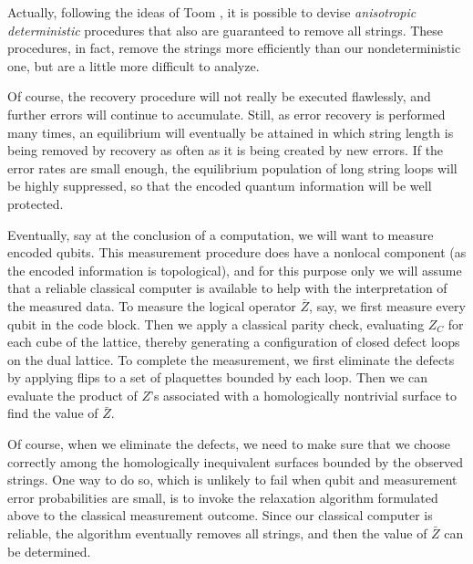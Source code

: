 Actually, following the ideas of Toom \cite{toom}, it is possible to devise {\em anisotropic deterministic} procedures that also are guaranteed to remove all strings. These procedures, in fact, remove the strings more efficiently than our nondeterministic one, but are a little more difficult to analyze.

Of course, the recovery procedure will not really be executed flawlessly, and further errors
will continue to accumulate. Still, as error recovery is performed many times,
an equilibrium will eventually be attained in which string length is being
removed by recovery as often as it is being created by new errors.  If the
error rates are small enough, the equilibrium population of long string loops
will be highly suppressed, so that the encoded quantum information will be well
protected.

Eventually, say at the conclusion of a computation, we will want to measure
encoded qubits.  This measurement procedure does have a nonlocal component (as
the encoded information is topological), and for this purpose only we will
assume that a reliable classical computer is available to help with the
interpretation of the measured data. To measure the logical operator $\bar Z$,
say, we first measure every qubit in the code block.  Then we apply a classical
parity check, evaluating $Z_C$ for each cube of the lattice, thereby generating a
configuration of closed defect loops on the dual lattice.  To complete the
measurement, we first eliminate the defects by applying flips to a set of
plaquettes bounded by each loop. Then we can evaluate the product of $Z$'s
associated with a homologically nontrivial surface to find the value of $\bar
Z$.

Of course, when we eliminate the defects, we need to make sure that we choose
correctly among the homologically inequivalent surfaces bounded by the observed
strings.  One way to do so,  which is unlikely to fail when qubit and measurement
error probabilities are small, is to invoke the relaxation algorithm formulated
above to the classical measurement outcome.  Since our classical computer is reliable,
the algorithm eventually removes all strings, and then the value of $\bar Z$
can be determined.


